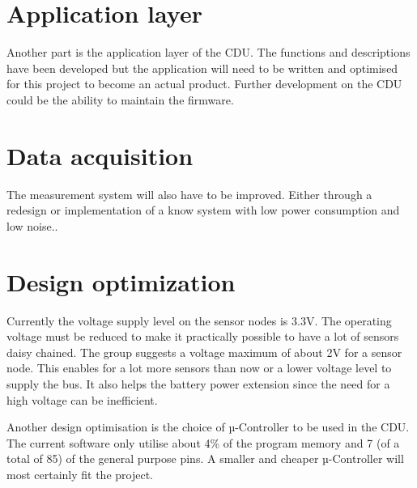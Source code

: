 \section{Application layer}
Another part is the application layer of the CDU. The functions and descriptions have been developed but the application will need to be written and optimised for this project to become an actual product. Further development on the CDU could be the ability to maintain the firmware.

\section{Data acquisition}
The measurement system will also have to be improved. Either through a redesign or implementation of a know system with low power consumption and low noise..

\section{Design optimization}
\label{sec:DO}
Currently the voltage supply level on the sensor nodes is 3.3V. The operating voltage must be reduced to make it practically possible to have a lot of sensors daisy chained. The group suggests a voltage maximum of about 2V for a sensor node. This enables for a lot more sensors than now or a lower voltage level to supply the bus. It also helps the battery power extension since the need for a high voltage can be inefficient.

Another design optimisation is the choice of µ-Controller to be used in the CDU. The current software only utilise about 4\% of the program memory and 7 (of a total of 85) of the general purpose pins. A smaller and cheaper µ-Controller will most certainly fit the project.